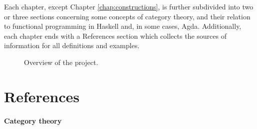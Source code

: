 Each chapter, except Chapter \ref{chap:constructions}, is further
subdivided into two or three sections concerning some concepts of
category theory, and their relation to functional programming in
Haskell and, in some cases, Agda. Additionally, each chapter ends with
a References section which collects the sources of information for all
definitions and examples.

\begin{figure}[htb]
  \begin{center}
  \end{center}
  \caption{Overview of the project.}
  \label{fig:overview}
\end{figure}

\section*{References}
\label{sec:introduction-references}

\paragraph{Category theory}

